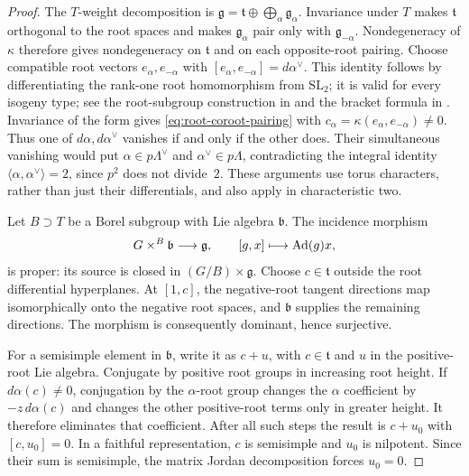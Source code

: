\begin{proof}
The $T$-weight decomposition is
$\mathfrak g=\mathfrak t\oplus\bigoplus_\alpha\mathfrak g_\alpha$.
Invariance under $T$ makes $\mathfrak t$ orthogonal to the root spaces
and makes $\mathfrak g_\alpha$ pair only with
$\mathfrak g_{-\alpha}$.  Nondegeneracy of $\kappa$ therefore gives
nondegeneracy on $\mathfrak t$ and on each opposite-root pairing.
Choose compatible root vectors $e_\alpha,e_{-\alpha}$ with
$[e_\alpha,e_{-\alpha}]=d\alpha^\vee$.  This identity follows by
differentiating the rank-one root homomorphism from $\mathrm{SL}_2$;
it is valid for every isogeny type; see the root-subgroup construction
in \cite[\S\S8.1.1--8.1.4]{Springer} and the bracket formula in
\cite[Corollary~5.1.12, Equation~(5.1.4)]{Conrad}. Invariance of the form gives
\eqref{eq:root-coroot-pairing} with
$c_\alpha=\kappa(e_\alpha,e_{-\alpha})\ne0$.
Thus one of $d\alpha,d\alpha^\vee$ vanishes if and only if the other
does.  Their simultaneous vanishing would put
$\alpha\in p\Lambda^\vee$ and $\alpha^\vee\in p\Lambda$,
contradicting the integral identity
$\langle\alpha,\alpha^\vee\rangle=2$, since $p^2$ does not divide~$2$.
These arguments use torus characters, rather than just their
differentials, and also apply in characteristic two.

Let $B\supset T$ be a Borel subgroup with Lie algebra $\mathfrak b$.
The incidence morphism
\[
 G\times^B\mathfrak b\longrightarrow\mathfrak g,
 \qquad [g,x]\longmapsto\operatorname{Ad}(g)x,
\]
is proper: its source is closed in $(G/B)\times\mathfrak g$.
Choose $c\in\mathfrak t$ outside the root differential hyperplanes.
At $[1,c]$, the negative-root tangent directions map isomorphically
onto the negative root spaces, and $\mathfrak b$ supplies the remaining
directions.  The morphism is consequently dominant, hence surjective.

For a semisimple element in $\mathfrak b$, write it as $c+u$, with
$c\in\mathfrak t$ and $u$ in the positive-root Lie algebra.
Conjugate by positive root groups in increasing root height.  If
$d\alpha(c)\ne0$, conjugation by the $\alpha$-root group changes the
$\alpha$ coefficient by $-z\,d\alpha(c)$ and changes the other
positive-root terms only in greater height.  It therefore eliminates
that coefficient.  After all such steps the result is $c+u_0$ with
$[c,u_0]=0$.  In a faithful representation, $c$ is semisimple and
$u_0$ is nilpotent.  Since their sum is semisimple, the matrix Jordan
decomposition forces $u_0=0$.
\end{proof}

